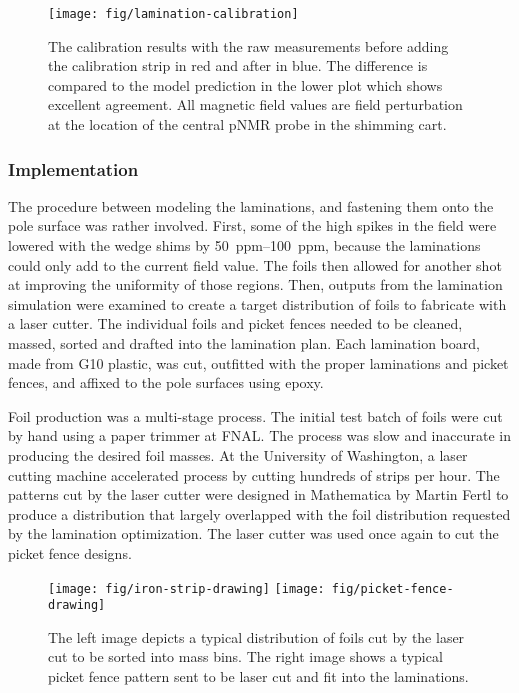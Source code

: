 \begin{figure}
\centering
\texttt{[image: fig/lamination-calibration]}
\caption{
    The calibration results with the raw measurements before adding the calibration strip in red and after in blue.  The difference is compared to the model prediction in the lower plot which shows excellent agreement.  All magnetic field values are field perturbation at the location of the central pNMR probe in the shimming cart. 
    \label{fig:lamination-calibration}
}
\end{figure}

\subsubsection{Implementation}

The procedure between modeling the laminations, and fastening them onto the pole surface was rather involved.  First, some of the high spikes in the field were lowered with the wedge shims by \SIrange{50}{100}{ppm}, because the laminations could only add to the current field value.  The foils then allowed for another shot at improving the uniformity of those regions.  Then, outputs from the lamination simulation were examined to create a target distribution of foils to fabricate with a laser cutter.  The individual foils and picket fences needed to be cleaned, massed, sorted and drafted into the lamination plan.  Each lamination board, made from G10 plastic, was cut, outfitted with the proper laminations and picket fences, and affixed to the pole surfaces using epoxy.

Foil production was a multi-stage process.  The initial test batch of foils were cut by hand using a paper trimmer at FNAL.  The process was slow and inaccurate in producing the desired foil masses.  At the University of Washington, a laser cutting machine accelerated process by cutting hundreds of strips per hour.  The patterns cut by the laser cutter were designed in Mathematica by Martin Fertl to produce a distribution that largely overlapped with the foil distribution requested by the lamination optimization.  The laser cutter was used once again to cut the picket fence designs.

\begin{figure}
\centering
\texttt{[image: fig/iron-strip-drawing]}
\texttt{[image: fig/picket-fence-drawing]}
\caption{
    The left image depicts a typical distribution of foils cut by the laser cut to be sorted into mass bins.  The right image shows a typical picket fence pattern sent to be laser cut and fit into the laminations.
    \label{fig:laser-cutter-drawings}
}
\end{figure}

